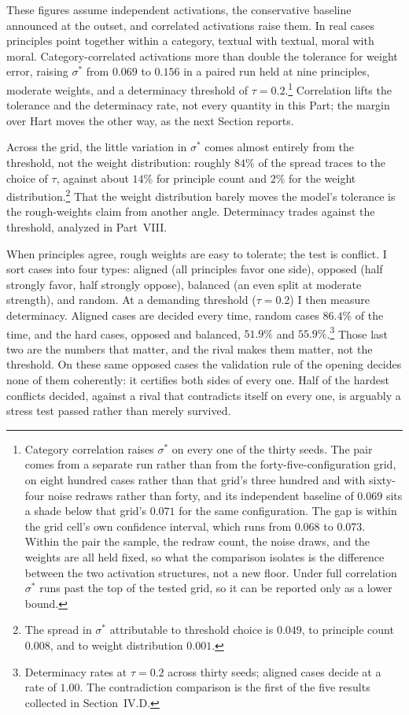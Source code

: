 These figures assume independent activations, the conservative baseline
announced at the outset, and correlated activations raise them. In real cases principles point together within a category, textual with
textual, moral with moral. Category-correlated activations more than double the tolerance for weight
error, raising $\sigma^{*}$ from $0.069$ to $0.156$ in a paired run held at
nine principles, moderate weights, and a determinacy threshold of
$\tau = 0.2$.\footnote{Category correlation raises $\sigma^{*}$ on every one of the thirty seeds. The
pair comes from a separate run rather than from the forty-five-configuration
grid, on eight hundred cases rather than that grid's three hundred and with
sixty-four noise redraws rather than forty, and its independent baseline of
$0.069$ sits a shade below that grid's $0.071$ for the same configuration. The
gap is within the grid cell's own confidence interval, which runs from $0.068$
to $0.073$. Within the pair the sample, the redraw count, the noise draws, and
the weights are all held fixed, so what the comparison isolates is the
difference between the two activation structures, not a new floor. Under
full correlation $\sigma^{*}$ runs past the top of the tested grid, so it
can be reported only as a lower bound.} Correlation lifts the
tolerance and the determinacy rate, not every quantity in this Part; the
margin over Hart moves the other way, as the next Section reports.

Across the grid, the little variation in $\sigma^{*}$ comes almost
entirely from the threshold, not the weight distribution: roughly $84\%$ of
the spread traces to the choice of $\tau$, against about $14\%$ for principle
count and $2\%$ for the weight distribution.\footnote{The spread in
$\sigma^{*}$ attributable to threshold choice is $0.049$, to principle count
$0.008$, and to weight distribution $0.001$.} That the weight distribution
barely moves the model's tolerance is the rough-weights claim from another
angle. Determinacy trades against the threshold, analyzed in
Part~VIII.

When principles agree, rough weights are easy to tolerate; the test is
conflict. I sort cases into four types: aligned (all principles favor one side),
opposed (half strongly favor, half strongly oppose), balanced (an even
split at moderate strength), and random. At a demanding threshold ($\tau =
0.2$) I then measure determinacy. Aligned cases are decided every time,
random cases $86.4\%$ of the time, and the hard cases, opposed and balanced,
$51.9\%$ and $55.9\%$.\footnote{Determinacy rates at $\tau = 0.2$ across
thirty seeds; aligned cases decide at a rate of $1.00$. The contradiction
comparison is the first of the five results collected in Section~IV.D.} Those last two are the numbers that
matter, and the rival makes them matter, not the
threshold. On these same opposed cases the validation rule of the opening decides
none of them coherently: it certifies both sides of every one. Half of the hardest conflicts decided, against a rival that contradicts
itself on every one, is arguably a stress test passed rather than merely
survived.

